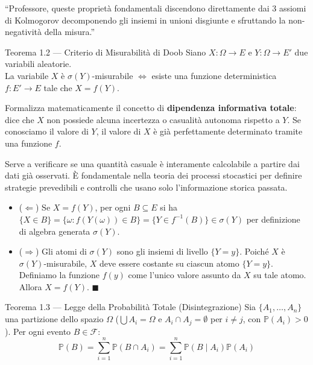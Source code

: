 \documentclass[11pt,a4paper]{report}
\newcommand{\PP}{\mathbb{P}}
\newcommand{\F}{\mathcal{F}}
\newcommand{\1}{\mathbf{1}}
\begin{document}
\begin{orale}
``Professore, queste proprietà fondamentali discendono direttamente dai 3 assiomi di Kolmogorov decomponendo gli insiemi in unioni disgiunte e sfruttando la non-negatività della misura.''
\end{orale}

\vspace{0.4cm}

\begin{teoremabox}{Teorema 1.2 --- Criterio di Misurabilità di Doob}
Siano $X: \Omega \to E$ e $Y: \Omega \to E'$ due variabili aleatorie.\\
La variabile $X$ è $\sigma(Y)$-misurabile $\iff$ esiste una funzione deterministica $f: E' \to E$ tale che $X = f(Y)$.
\end{teoremabox}

\begin{cosafa}
Formalizza matematicamente il concetto di \textbf{dipendenza informativa totale}: dice che $X$ non possiede alcuna incertezza o casualità autonoma rispetto a $Y$. Se conosciamo il valore di $Y$, il valore di $X$ è già perfettamente determinato tramite una funzione $f$.
\end{cosafa}

\begin{acosaserve}
Serve a verificare se una quantità casuale è interamente calcolabile a partire dai dati già osservati. È fondamentale nella teoria dei processi stocastici per definire strategie prevedibili e controlli che usano solo l'informazione storica passata.
\end{acosaserve}

\begin{dimostrazione}
\begin{itemize}
    \item ($\Leftarrow$) Se $X = f(Y)$, per ogni $B \subseteq E$ si ha $\{X \in B\} = \{\omega : f(Y(\omega)) \in B\} = \{Y \in f^{-1}(B)\} \in \sigma(Y)$ per definizione di algebra generata $\sigma(Y)$.
    \item ($\Rightarrow$) Gli atomi di $\sigma(Y)$ sono gli insiemi di livello $\{Y = y\}$. Poiché $X$ è $\sigma(Y)$-misurabile, $X$ deve essere costante su ciascun atomo $\{Y = y\}$. Definiamo la funzione $f(y)$ come l'unico valore assunto da $X$ su tale atomo. Allora $X = f(Y)$. $\blacksquare$
\end{itemize}
\end{dimostrazione}

\newpage

\begin{teoremabox}{Teorema 1.3 --- Legge della Probabilità Totale (Disintegrazione)}
Sia $\{A_1, \dots, A_n\}$ una partizione dello spazio $\Omega$ ($\bigcup A_i = \Omega$ e $A_i \cap A_j = \emptyset$ per $i \ne j$, con $\PP(A_i) > 0$). Per ogni evento $B \in \F$:
\[ \PP(B) = \sum_{i=1}^n \PP(B \cap A_i) = \sum_{i=1}^n \PP(B \mid A_i) \PP(A_i) \]
\end{teoremabox}
\end{document}
